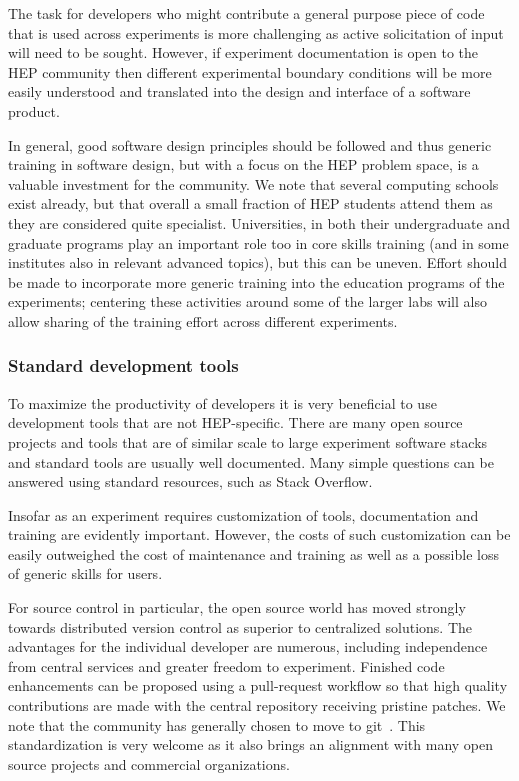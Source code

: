 \documentclass[12pt,a4paper]{article}
\begin{document}
The task for developers who might contribute a general purpose piece of
code that is used across experiments is more challenging as active
solicitation of input will need to be sought. However, if experiment
documentation is open to the HEP community then different experimental
boundary conditions will be more easily understood and translated into
the design and interface of a software product.

In general, good software design principles should be followed and thus
generic training in software design, but with a focus on the HEP problem
space, is a valuable investment for the community. We note that several
computing schools exist already, but that overall a small fraction of
HEP students attend them as they are considered quite specialist.
Universities, in both their undergraduate and graduate programs play an
important role too in core skills training (and in some institutes also
in relevant advanced topics), but this can be uneven. Effort should be
made to incorporate more generic training into the education programs of
the experiments; centering these activities around some of the larger
labs will also allow sharing of the training effort across different
experiments.

\hypertarget{standard-development-tools}{%
\subsubsection{Standard development
tools}\label{standard-development-tools}}

To maximize the productivity of developers it is very beneficial to use
development tools that are not HEP-specific. There are many open source
projects and tools that are of similar scale to large experiment
software stacks and standard tools are usually well documented. Many
simple questions can be answered using standard resources, such as Stack
Overflow.

Insofar as an experiment requires customization of tools, documentation
and training are evidently important. However, the costs of such
customization can be easily outweighed the cost of maintenance and
training as well as a possible loss of generic skills for users.

For source control in particular, the open source world has moved
strongly towards distributed version control as superior to centralized
solutions. The advantages for the individual developer are numerous,
including independence from central services and greater freedom to
experiment. Finished code enhancements can be proposed using a
pull-request workflow so that high quality contributions are made with
the central repository receiving pristine patches. We note that the
community has generally chosen to move to git~\cite{git}. This standardization
is very welcome as it also brings an alignment with many open source
projects and commercial organizations.
\end{document}
